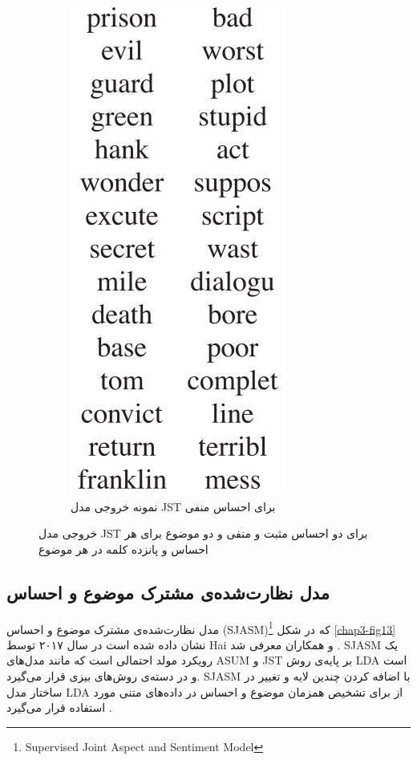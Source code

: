 \begin{figure}[!b]
\begin{subfigure}{0.4\textwidth}
			\includegraphics[scale=0.2]{chap3-img/JSTexamplen}
			\caption{نمونه خروجی مدل JST برای احساس منفی}
			\label{chap3-fig12-2}
		\end{subfigure}
		\caption{خروجی مدل JST برای دو احساس مثبت و منفی‌ و دو موضوع برای هر احساس و پانزده کلمه در هر موضوع \cite{lin2012weakly}}
		\label{chap3-fig12}
	\end{figure}

\subsection{مدل نظارت‌شده‌ی مشترک موضوع و احساس}
\label{chap3sec4sub3}
مدل نظارت‌شده‌ی مشترک موضوع و احساس
(SJASM)\footnote{Supervised Joint Aspect and Sentiment Model}
که در شکل
\ref{chap3-fig13}
 نشان داده شده است در سال ۲۰۱۷ توسط 
Hai
و همکاران معرفی‌ شد
\cite{7855825}. 
SJASM
یک رویکرد مولد احتمالی است که مانند مدل‌های 
ASUM
و 
JST
بر پایه‌ی روش 
LDA
است و در دسته‌ی روش‌های بیزی قرار می‌گیرد. SJASM با اضافه کردن چندین لایه و تغییر در ساختار مدل 
LDA
از برای تشخیص همزمان موضوع و احساس در داده‌های متنی مورد استفاده قرار می‌گیرد
\cite{7855825}.

